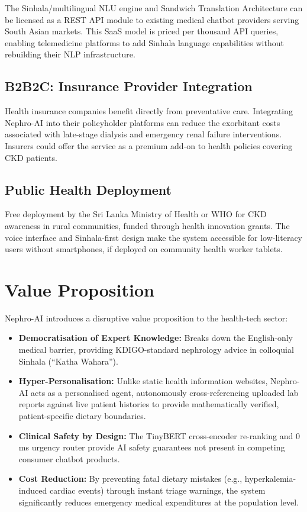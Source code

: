 \documentclass[12pt,a4paper]{report}
\begin{document}
The Sinhala/multilingual NLU engine and Sandwich Translation Architecture can be licensed as a REST API module to existing medical chatbot providers serving South Asian markets. This SaaS model is priced per thousand API queries, enabling telemedicine platforms to add Sinhala language capabilities without rebuilding their NLP infrastructure.

\subsection{B2B2C: Insurance Provider Integration}

Health insurance companies benefit directly from preventative care. Integrating Nephro-AI into their policyholder platforms can reduce the exorbitant costs associated with late-stage dialysis and emergency renal failure interventions. Insurers could offer the service as a premium add-on to health policies covering CKD patients.

\subsection{Public Health Deployment}

Free deployment by the Sri Lanka Ministry of Health or WHO for CKD awareness in rural communities, funded through health innovation grants. The voice interface and Sinhala-first design make the system accessible for low-literacy users without smartphones, if deployed on community health worker tablets.

\section{Value Proposition}

Nephro-AI introduces a disruptive value proposition to the health-tech sector:

\begin{itemize}
  \item \textbf{Democratisation of Expert Knowledge:} Breaks down the English-only medical barrier, providing KDIGO-standard nephrology advice in colloquial Sinhala (``Katha Wahara'').

  \item \textbf{Hyper-Personalisation:} Unlike static health information websites, Nephro-AI acts as a personalised agent, autonomously cross-referencing uploaded lab reports against live patient histories to provide mathematically verified, patient-specific dietary boundaries.

  \item \textbf{Clinical Safety by Design:} The TinyBERT cross-encoder re-ranking and 0\,ms urgency router provide AI safety guarantees not present in competing consumer chatbot products.

  \item \textbf{Cost Reduction:} By preventing fatal dietary mistakes (e.g., hyperkalemia-induced cardiac events) through instant triage warnings, the system significantly reduces emergency medical expenditures at the population level.
\end{itemize}
\end{document}
